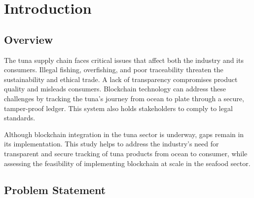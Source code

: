 \chapter{Introduction}
\label{sec:researchdesc}    %

\section{Overview}
\label{sec:overview}
The tuna supply chain faces critical issues that affect both the industry and its consumers. Illegal fishing, overfishing, and poor traceability threaten the sustainability and ethical trade. A lack of transparency compromises product quality and misleads consumers. Blockchain technology can address these challenges by tracking the tuna's journey from ocean to plate through a secure, tamper-proof ledger. This system also holds stakeholders to comply to legal standards.

\noindent Although blockchain integration in the tuna sector is underway, gaps remain in its implementation. This study helps to address the industry’s need for transparent and secure tracking of tuna products from ocean to consumer, while assessing the feasibility of implementing blockchain at scale in the seafood sector.


\section{Problem Statement}

